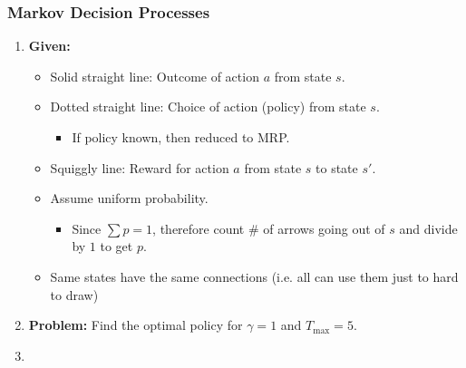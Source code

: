 \subsubsection{Markov Decision Processes}
\begin{example}
    \begin{enumerate}
        \item \textbf{Given:}
        \begin{itemize}
            \item Solid straight line: Outcome of action $a$ from state $s$.
            \item Dotted straight line: Choice of action (policy) from state $s$.
            \begin{itemize}
                \item If policy known, then reduced to MRP.
            \end{itemize}
            \item Squiggly line: Reward for action $a$ from state $s$ to state $s'$.
            \item Assume uniform probability. 
            \begin{itemize}
                \item Since $\sum p= 1$, therefore count \# of arrows going out of $s$ and divide by $1$ to get $p$.
            \end{itemize}
            \item Same states have the same connections (i.e. all can use them just to hard to draw)
        \end{itemize}
        \item \textbf{Problem:} Find the optimal policy for $\gamma=1$ and $T_{\max} = 5$.
        \item 
    \end{enumerate}
\end{example}


